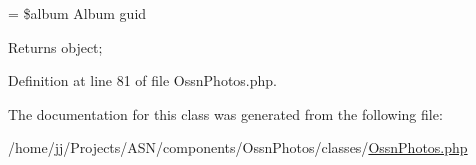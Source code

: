 = \$album Album guid

\begin{DoxyReturn}{Returns}
object; 
\end{DoxyReturn}


Definition at line 81 of file Ossn\+Photos.\+php.



The documentation for this class was generated from the following file\+:\begin{DoxyCompactItemize}
\item 
/home/jj/\+Projects/\+A\+S\+N/components/\+Ossn\+Photos/classes/\hyperlink{classes_2_ossn_photos_8php}{Ossn\+Photos.\+php}\end{DoxyCompactItemize}
